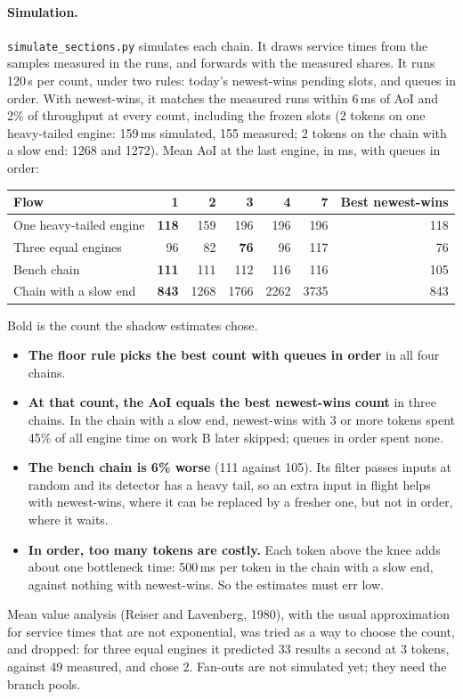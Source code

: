 \documentclass[11pt]{article}
\newcommand{\code}[1]{\texttt{#1}}
\begin{document}
\paragraph{Simulation.} \code{simulate\_sections.py} simulates each chain.
It draws service times from the samples measured in the runs, and forwards
with the measured shares. It runs 120\,s per count, under two rules: today's newest-wins
pending slots, and queues in order. With newest-wins, it matches the
measured runs within 6\,ms of AoI and 2\% of throughput at every count,
including the frozen slots (2 tokens on one heavy-tailed engine: 159\,ms
simulated, 155 measured; 2 tokens on the chain with a slow end: 1268 and
1272). Mean AoI at the last engine, in ms, with queues in order:
\begin{center}
\small
\begin{tabular}{@{}lrrrrrr@{}}
\toprule
Flow & 1 & 2 & 3 & 4 & 7 & Best newest-wins \\
\midrule
One heavy-tailed engine & \textbf{118} & 159  & 196  & 196  & 196  & 118 \\
Three equal engines     & 96  & 82   & \textbf{76}  & 96   & 117  & 76 \\
Bench chain             & \textbf{111} & 111  & 112  & 116  & 116  & 105 \\
Chain with a slow end   & \textbf{843} & 1268 & 1766 & 2262 & 3735 & 843 \\
\bottomrule
\end{tabular}
\end{center}
Bold is the count the shadow estimates chose.
\begin{itemize}[nosep]
  \item \textbf{The floor rule picks the best count with queues in order}
        in all four chains.
  \item \textbf{At that count, the AoI equals the best newest-wins count}
        in three chains. In the chain with a slow end, newest-wins with 3 or
        more tokens spent 45\% of all engine time on work B later skipped;
        queues in order spent none.
  \item \textbf{The bench chain is 6\% worse} (111 against 105). Its filter
        passes inputs at random and its detector has a heavy tail, so an
        extra input in flight helps with newest-wins, where it can be
        replaced by a fresher one, but not in order, where it waits.
  \item \textbf{In order, too many tokens are costly.} Each token above the
        knee adds about one bottleneck time: 500\,ms per token in the chain
        with a slow end, against nothing with newest-wins. So the estimates
        must err low.
\end{itemize}
Mean value analysis (Reiser and Lavenberg, 1980), with the usual
approximation for service times that are not exponential, was tried as a
way to choose the count, and dropped: for three equal engines it predicted
33 results a second at 3 tokens, against 49 measured, and chose 2. Fan-outs
are not simulated yet; they need the branch pools.
\end{document}

